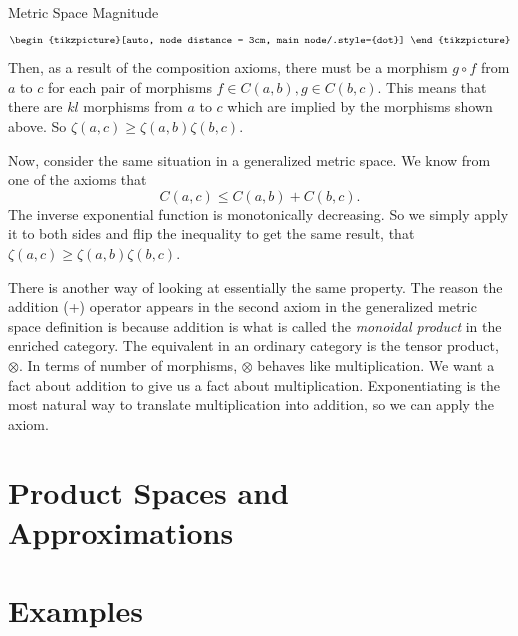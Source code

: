 \documentclass[12pt]{pom_thesis}
\begin{document}
\begin{chapter}{Metric Space Magnitude}
\[\begin{tikzpicture}[auto, node distance = 3cm, main node/.style={dot}]
\end{tikzpicture}\]
Then, as a result of the composition axioms, there must be a morphism $g \circ f$ from $a$ to $c$ for each pair of morphisms $f \in C(a,b), g \in C(b,c)$. This means that there are $kl$ morphisms from $a$ to $c$ which are implied by the morphisms shown above. So $\zeta(a,c) \geq \zeta(a,b)  \zeta(b,c)$. 

Now, consider the same situation in a generalized metric space. We know from one of the axioms that
\[
C(a,c) \leq C(a,b) + C(b,c).
\]
The inverse exponential function is monotonically decreasing. So we simply apply it to both sides and flip the inequality to get the same result, that $\zeta(a,c) \geq \zeta(a,b) \zeta(b,c)$.

There is another way of looking at essentially the same property. The reason the addition (+) operator appears in the second axiom in the generalized metric space definition is because addition is what is called the \textit{monoidal product} in the enriched category. The equivalent in an ordinary category is the tensor product, $\otimes$. In terms of number of morphisms, $\otimes$ behaves like multiplication. We want a fact about addition to give us a fact about multiplication. Exponentiating is the most natural way to translate multiplication into addition, so we can apply the axiom.
\section{Product Spaces and Approximations}
\section{Examples}
\end{chapter}




\end{document}
